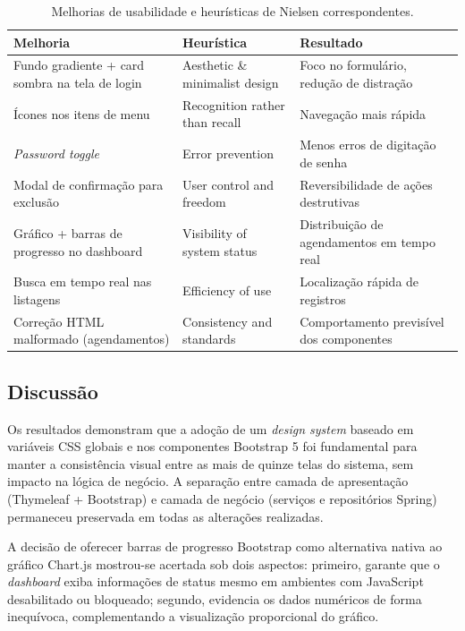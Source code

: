 \begin{table}[H]
\centering
\small
\begin{tabular}{p{5cm} p{4cm} p{4.5cm}}
\hline
\textbf{Melhoria} & \textbf{Heurística} & \textbf{Resultado} \\ \hline
Fundo gradiente + card sombra na tela de login &
  Aesthetic \& minimalist design &
  Foco no formulário, redução de distração \\[4pt]
Ícones nos itens de menu &
  Recognition rather than recall &
  Navegação mais rápida \\[4pt]
\textit{Password toggle} &
  Error prevention &
  Menos erros de digitação de senha \\[4pt]
Modal de confirmação para exclusão &
  User control and freedom &
  Reversibilidade de ações destrutivas \\[4pt]
Gráfico + barras de progresso no dashboard &
  Visibility of system status &
  Distribuição de agendamentos em tempo real \\[4pt]
Busca em tempo real nas listagens &
  Efficiency of use &
  Localização rápida de registros \\[4pt]
Correção HTML malformado (agendamentos) &
  Consistency and standards &
  Comportamento previsível dos componentes \\ \hline
\end{tabular}
\caption{Melhorias de usabilidade e heurísticas de Nielsen correspondentes.}
\label{tab:melhorias}
\end{table}

\subsection{Discussão}

Os resultados demonstram que a adoção de um \textit{design system} baseado
em variáveis CSS globais e nos componentes Bootstrap 5 foi fundamental para
manter a consistência visual entre as mais de quinze telas do sistema, sem
impacto na lógica de negócio.  A separação entre camada de apresentação
(Thymeleaf + Bootstrap) e camada de negócio (serviços e repositórios Spring)
permaneceu preservada em todas as alterações realizadas.

A decisão de oferecer barras de progresso Bootstrap como alternativa nativa
ao gráfico Chart.js mostrou-se acertada sob dois aspectos: primeiro, garante
que o \textit{dashboard} exiba informações de status mesmo em ambientes com
JavaScript desabilitado ou bloqueado; segundo, evidencia os dados numéricos
de forma inequívoca, complementando a visualização proporcional do gráfico.

